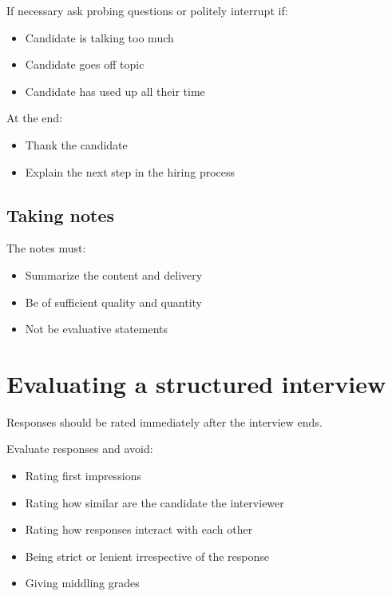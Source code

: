 \documentclass{article}
\begin{document}
If necessary ask probing questions or politely interrupt if:
\begin{itemize}
  \item Candidate is talking too much
  \item Candidate goes off topic
  \item Candidate has used up all their time
\end{itemize}

At the end:
\begin{itemize}
  \item Thank the candidate
  \item Explain the next step in the hiring process
\end{itemize}


\subsection{Taking notes}

The notes must:
\begin{itemize}
  \item Summarize the content and delivery
  \item Be of sufficient quality and quantity
  \item Not be evaluative statements
\end{itemize}



\section{Evaluating a structured interview}

Responses should be rated immediately after the interview ends.

Evaluate responses and avoid:
\begin{itemize}
  \item Rating first impressions
  \item Rating how similar are the candidate the interviewer
  \item Rating how responses interact with each other
  \item Being strict or lenient irrespective of the response
  \item Giving middling grades
\end{itemize}
\end{document}
